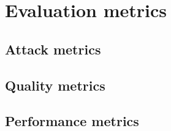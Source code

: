 \section{Evaluation metrics}\label{sec:evaluation-metrics}

\subsection{Attack metrics}\label{subsec:attack-metrics}


\subsection{Quality metrics}\label{subsec:quality-metrics}


\subsection{Performance metrics}\label{subsubsec:performance-metrics}


